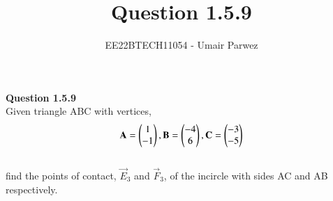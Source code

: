 \documentclass[journal,12pt,twocolumn]{IEEEtran}
\theoremstyle{remark}
\begin{document}



\vspace{3cm}

\title{
	Question 1.5.9
}

\author{
	EE22BTECH11054 - Umair Parwez
}	

\maketitle
\newpage
\bigskip

\renewcommand{\thefigure}{\theenumi}
\renewcommand{\thetable}{\theenumi}

\begin{flushleft}
	\textbf{Question 1.5.9}\\
	\bigskip
	Given triangle ABC with vertices, 
	\begin{align}
		\mathbf{A} = \begin{pmatrix}1\\ -1\end{pmatrix}, \mathbf{B} = \begin{pmatrix}-4\\ 6\end{pmatrix}, \mathbf{C} = \begin{pmatrix}-3\\ -5\end{pmatrix}
	\end{align}\\
	find the points of contact, $\vec{E}_3$ and $\vec{F}_3$, of the incircle with sides AC and AB respectively.\\
	\bigskip
\end{flushleft}
\end{document}
